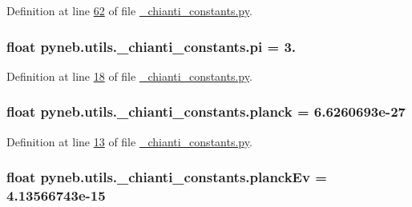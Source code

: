 Definition at line \hyperlink{__chianti__constants_8py_source_l00062}{62} of file \hyperlink{__chianti__constants_8py_source}{\-\_\-chianti\-\_\-constants.\-py}.

\hypertarget{namespacepyneb_1_1utils_1_1__chianti__constants_ad25c8208e2cf163e8bc97367e09e07a8}{
\subsubsection[{pi}]{\setlength{\rightskip}{0pt plus 5cm}float pyneb.\-utils.\-\_\-chianti\-\_\-constants.\-pi = 3.}}\label{namespacepyneb_1_1utils_1_1__chianti__constants_ad25c8208e2cf163e8bc97367e09e07a8}


Definition at line \hyperlink{__chianti__constants_8py_source_l00018}{18} of file \hyperlink{__chianti__constants_8py_source}{\-\_\-chianti\-\_\-constants.\-py}.

\hypertarget{namespacepyneb_1_1utils_1_1__chianti__constants_a7a52a58fab4374274ebc5466bbd1b2a1}{
\subsubsection[{planck}]{\setlength{\rightskip}{0pt plus 5cm}float pyneb.\-utils.\-\_\-chianti\-\_\-constants.\-planck = 6.\-6260693e-\/27}}\label{namespacepyneb_1_1utils_1_1__chianti__constants_a7a52a58fab4374274ebc5466bbd1b2a1}


Definition at line \hyperlink{__chianti__constants_8py_source_l00013}{13} of file \hyperlink{__chianti__constants_8py_source}{\-\_\-chianti\-\_\-constants.\-py}.

\hypertarget{namespacepyneb_1_1utils_1_1__chianti__constants_ae1ab6400d7b260ee4a719f00435fc2ab}{
\subsubsection[{planck\-Ev}]{\setlength{\rightskip}{0pt plus 5cm}float pyneb.\-utils.\-\_\-chianti\-\_\-constants.\-planck\-Ev = 4.\-13566743e-\/15}}\label{namespacepyneb_1_1utils_1_1__chianti__constants_ae1ab6400d7b260ee4a719f00435fc2ab}



